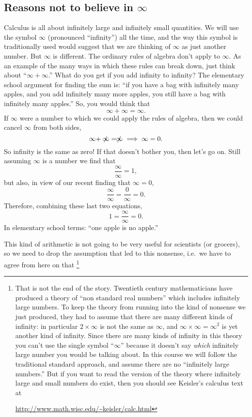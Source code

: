 \subsection{Reasons not to believe in $\infty$}
\label{sec:infinity-not-a-number}
Calculus is all about infinitely large and infinitely small
quantities.  We will use the symbol $\infty$ (pronounced ``infinity'')
all the time, and the way this symbol is traditionally used would suggest that we
are thinking of $\infty$ as just another number.  But $\infty$ is
different.  The ordinary rules of algebra don't apply to $\infty$.  As
an example of the many ways in which these rules can break down, just
think about ``$\infty + \infty$.''  What do you get if you add
infinity to infinity?  The elementary school argument for finding the
sum is: ``if you have a bag with infinitely many apples, and you add
infinitely many more apples, you still have a bag with infinitely many
apples.'' So, you would think that
\[
\infty + \infty = \infty.
\]
If $\infty$ were a number to which we could apply the rules of
algebra, then we could cancel $\infty$ from both sides, 
\[
\infty + \not\!\!\infty = \not\!\!\infty \implies \infty = 0.
\]
So infinity is the same as zero!  If that doesn't bother you, then
let's go on.  Still assuming $\infty$ is a number we find that
\[
\frac{\infty}{\infty} = 1,
\]
but also, in view of our recent finding that $\infty = 0$, 
\[
\frac{\infty}{\infty} = \frac{0}{\infty} = 0.
\]
Therefore, combining these last two equations,
\[
1=\frac { \infty }{\infty}=0.
\]
In elementary school terms: ``one apple is no apple.''

This kind of arithmetic is not going to be very useful for scientists (or
grocers), so we need to drop the assumption that led to this nonsense,
i.e.\ we have to agree from here on that \footnote{That is not the end of
  the story.  Twentieth century mathematicians have produced a theory of
  ``non standard real numbers'' which includes infinitely large numbers.
  To keep the theory from running into the kind of nonsense we just
  produced, they had to assume that there are many different kinds of
  infinity: in particular $2\times\infty$ is not the same as $\infty$, and
  $\infty\times\infty = \infty^2$ is yet another kind of infinity.  Since
  there are many kinds of infinity in this theory you can't use the single
  symbol ``$\infty$'' because it doesn't say \emph{which} infinitely large
  number you would be talking about.  In this course we will follow the
  traditional standard approach, and assume there are no ``infinitely large
  numbers.'' But if you want to read the version of the theory where
  infinitely large and small numbers do exist, then you should see
  Keisler's calculus text at
  \centerline{\url{http://www.math.wisc.edu/~keisler/calc.html}} }
\begin{center}
\end{center}

